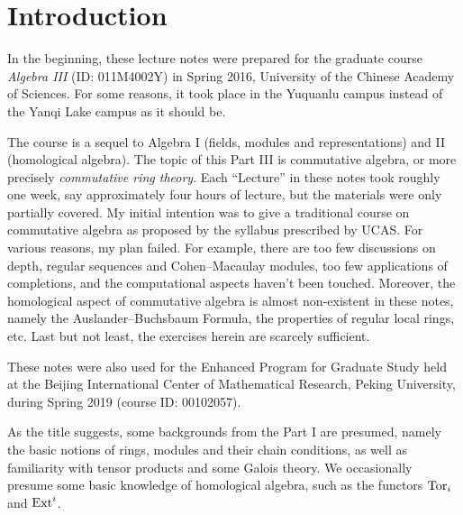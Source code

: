 
\chapter*{Introduction}

In the beginning, these lecture notes were prepared for the graduate course \emph{Algebra III} (ID: 011M4002Y) in Spring 2016, University of the Chinese Academy of Sciences. For some reasons, it took place in the Yuquanlu campus instead of the Yanqi Lake campus as it should be.

The course is a sequel to Algebra I (fields, modules and representations) and II (homological algebra). The topic of this Part III is commutative algebra, or more precisely \emph{commutative ring theory}. Each ``Lecture'' in these notes took roughly one week, say approximately four hours of lecture, but the materials were only partially covered. My initial intention was to give a traditional course on commutative algebra as proposed by the syllabus prescribed by UCAS. For various reasons, my plan failed. For example, there are too few discussions on depth, regular sequences and Cohen--Macaulay modules, too few applications of completions, and the computational aspects haven't been touched. Moreover, the homological aspect of commutative algebra is almost non-existent in these notes, namely the Auslander--Buchsbaum Formula, the properties of regular local rings, etc. Last but not least, the exercises herein are scarcely sufficient.

These notes were also used for the Enhanced Program for Graduate Study held at the Beijing International Center of Mathematical Research, Peking University, during Spring 2019 (course ID: 00102057).

As the title suggests, some backgrounds from the Part I are presumed, namely the basic notions of rings, modules and their chain conditions, as well as familiarity with tensor products and some Galois theory. We occasionally presume some basic knowledge of homological algebra, such as the functors $\operatorname{Tor}_i$ and $\operatorname{Ext}^i$.

